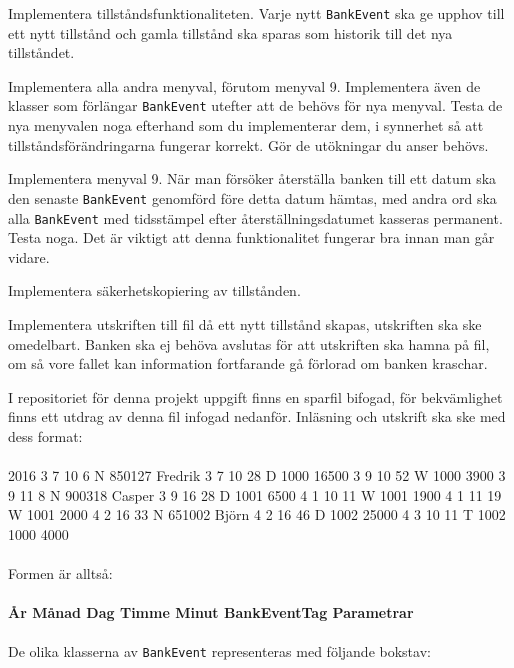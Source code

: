 \Subtask Implementera tillståndsfunktionaliteten. Varje nytt \texttt{BankEvent} ska ge upphov till ett nytt tillstånd och gamla tillstånd ska sparas som historik till det nya tillståndet.

\Subtask Implementera alla andra menyval, förutom menyval 9. Implementera även de klasser som förlängar \texttt{BankEvent} utefter att de behövs för nya menyval.
Testa de nya menyvalen noga efterhand som du implementerar dem, i synnerhet så att tillståndsförändringarna fungerar korrekt. Gör de utökningar du anser behövs. 

\Task Implementera menyval 9. När man försöker återställa banken till ett datum ska den senaste \texttt{BankEvent} genomförd före detta datum hämtas, med andra ord ska alla \texttt{BankEvent} med tidsstämpel efter återställningsdatumet kasseras permanent. Testa noga. Det är viktigt att denna funktionalitet fungerar bra innan man går vidare.

\Task Implementera säkerhetskopiering av tillstånden.

\Subtask Implementera utskriften till fil då ett nytt tillstånd skapas, utskriften ska ske omedelbart. Banken ska ej behöva avslutas för att utskriften ska hamna på fil, om så vore fallet kan information fortfarande gå förlorad om banken kraschar.

I repositoriet för denna projekt uppgift finns en sparfil bifogad, för bekvämlighet finns ett utdrag av denna fil  infogad nedanför. Inläsning och utskrift ska ske med dess format:\\~\\
2016 3 7 10 6 N 850127 Fredrik 3 7 10 28 D 1000 16500 3 9 10 52 W 1000 3900 3 9 11 8 N 900318 Casper 3 9 16 28 D 1001 6500 4 1 10 11 W 1001 1900 4 1 11 19 W 1001 2000 4 2 16 33 N 651002 Björn 4 2 16 46 D 1002 25000 4 3 10 11 T 1002 1000 4000\\~\\
Formen är alltså:\\~\\
\textbf{År  Månad  Dag  Timme  Minut  BankEventTag  Parametrar}
\\~\\
De olika klasserna av \texttt{BankEvent} representeras med följande bokstav:

